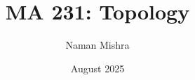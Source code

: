 \documentclass[12pt]{report}
\title{MA 231: Topology}
\author{Naman Mishra}
\date{August 2025}
\begin{document}
\maketitle
\tableofcontents
\listoflecture
    
    
    
    
    
\end{document}
